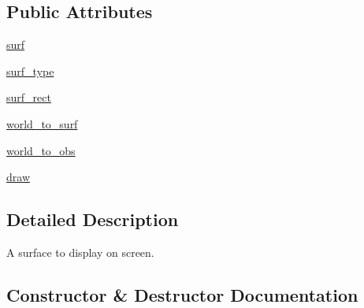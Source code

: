 \subsection*{Public Attributes}
\begin{DoxyCompactItemize}
\item 
\mbox{\hyperlink{classpysc2_1_1lib_1_1renderer__human_1_1___surface_a4f0f39530a27df058f01c18e19f705f6}{surf}}
\item 
\mbox{\hyperlink{classpysc2_1_1lib_1_1renderer__human_1_1___surface_a5f951c622b86c80f949b09f274995ffe}{surf\+\_\+type}}
\item 
\mbox{\hyperlink{classpysc2_1_1lib_1_1renderer__human_1_1___surface_a3a7c29c8853fde7755b1c9908631a8b3}{surf\+\_\+rect}}
\item 
\mbox{\hyperlink{classpysc2_1_1lib_1_1renderer__human_1_1___surface_a76ded3196283f7e7104ba8f8a784c917}{world\+\_\+to\+\_\+surf}}
\item 
\mbox{\hyperlink{classpysc2_1_1lib_1_1renderer__human_1_1___surface_a7fa7b3c456fca16f552252649db7ac44}{world\+\_\+to\+\_\+obs}}
\item 
\mbox{\hyperlink{classpysc2_1_1lib_1_1renderer__human_1_1___surface_ada72ce60001e5107b602d6543007c9de}{draw}}
\end{DoxyCompactItemize}


\subsection{Detailed Description}
\begin{DoxyVerb}A surface to display on screen.\end{DoxyVerb}
 

\subsection{Constructor \& Destructor Documentation}
\mbox{\label{classpysc2_1_1lib_1_1renderer__human_1_1___surface_a1357779bf7813158c9333300636fd107}} 
